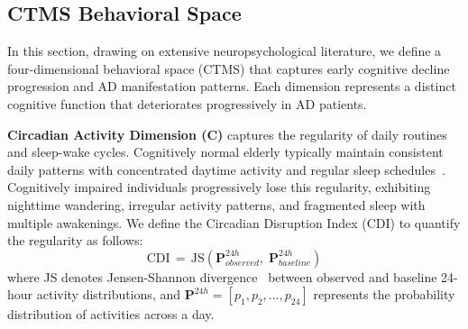 \documentclass[sigconf, anonymous, 9pt, nonacm]{acmart}
\begin{document}
\subsection{CTMS Behavioral Space}

In this section, drawing on extensive neuropsychological literature, we define a four-dimensional behavioral space (CTMS) that captures early cognitive decline progression and AD manifestation patterns. 
Each dimension represents a distinct cognitive function that deteriorates progressively in AD patients.

\noindent\textbf{Circadian Activity Dimension (C)} captures the regularity of daily routines and sleep-wake cycles. Cognitively normal elderly typically maintain consistent daily patterns with concentrated daytime activity and regular sleep schedules~\cite{Musiek2018RestActivity}. Cognitively impaired individuals progressively lose this regularity, exhibiting nighttime wandering, irregular activity patterns, and fragmented sleep with multiple awakenings.
We define the Circadian Disruption Index (CDI) to quantify the regularity as follows:
\begin{equation*}
\text{CDI}\, = \,\text{JS}(\mathbf{P}_{observed}^{24h},\; \mathbf{P}_{baseline}^{24h})
\end{equation*}
where JS denotes Jensen-Shannon divergence~\cite{lin1991divergence} between observed and baseline 24-hour activity distributions, and $\mathbf{P}^{24h} = [p_1, p_2, ..., p_{24}]$ represents the probability distribution of activities across a day.
\end{document}
